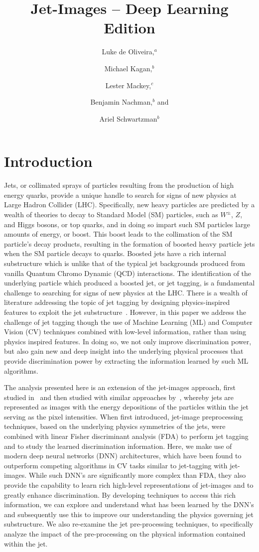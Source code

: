 \documentclass{article}
\title{Jet-Images -- Deep Learning Edition}
\author{Luke de Oliveira,${}^a$}
\author{Michael Kagan,${}^{b}$}
\author{Lester Mackey,${}^c$}
\author{Benjamin Nachman,${}^{b}$ and}
\author{Ariel Schwartzman${}^b$}
\affiliation{$^{a}$ Institute for Computational and Mathematical Engineering, Stanford University, Stanford, CA 94305, USA}
\affiliation{$^{b}$SLAC National Accelerator Laboratory, Stanford University, 2575 Sand Hill Rd, Menlo Park,
  CA 94025, U.S.A.}
\affiliation{$^{a}$Department of Statistics, Stanford University, Stanford, CA 94305, USA}
\begin{document}
\maketitle

\section{Introduction}
Jets, or collimated sprays of particles resulting from the production of high energy quarks, provide a unique handle to search for signs of new physics at Large Hadron Collider (LHC).  Specifically, new heavy particles are predicted by a wealth of theories to decay to Standard Model (SM) particles, such as $W^{\pm}$, $Z$, and Higgs bosons, or top quarks, and in doing so impart such SM particles large amounts of energy, or boost.  This boost leads to the collimation of the SM particle's decay products, resulting in the formation of boosted heavy particle jets when the SM particle decays to quarks.   Boosted jets have a rich internal substructure which is unlike that of the typical jet backgrounds produced from vanilla Quantum Chromo Dynamic (QCD) interactions.  The identification of the underlying particle which produced a boosted jet, or jet tagging, is a fundamental challenge to searching for signs of new physics at the LHC.  There is a wealth of literature addressing the topic of jet tagging by designing physics-inspired features to exploit the jet substructure~\cite{stuff}.  However, in this paper we address the challenge of jet tagging though the use of Machine Learning (ML) and Computer Vision (CV) techniques combined with low-level information, rather than using physics inspired features.  In doing so, we not only improve discrimination power, but also gain new and deep insight into the underlying physical processes that provide discrimination power by extracting the information learned by such ML algorithms. 

The analysis presented here is an extension of the jet-images approach, first studied in~\cite{JetImages} and then studied with similar approaches by~\cite{Others}, whereby jets are represented as images with the energy depositions of the particles within the jet serving as the pixel intensities.  When first introduced, jet-image preprocessing techniques, based on the underlying physics symmetries of the jets, were combined with linear Fisher discriminant analysis (FDA) to perform jet tagging and to study the learned discrimination information.  Here, we make use of modern deep neural networks (DNN) architectures, which have been found to outperform competing algorithms in CV tasks similar to jet-tagging with jet-images.  While such DNN's are significantly more complex than FDA, they also provide the capability to learn rich high-level representations of jet-images and to greatly enhance discrimination.  By developing techniques to access this rich information, we can explore and understand what has been learned by the DNN's and subsequently use this to improve our understanding the physics governing jet substructure.  We also re-examine the jet pre-processing techniques, to specifically analyze the impact of the pre-processing on the physical information contained within the jet.
\end{document}
